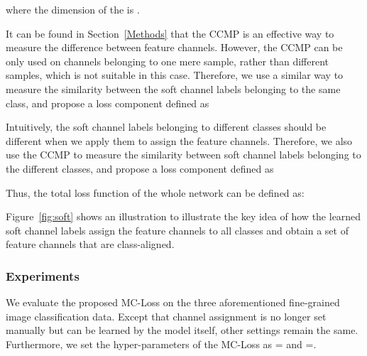 \documentclass[journal]{IEEEtran}
\begin{document}
\begin{small}

\end{small}

\noindent where the dimension of the  is .

It can be found in Section~\ref{Methods} that the CCMP is an effective way to measure the difference between feature channels. However, the CCMP can  be only  used on channels belonging to one mere sample, rather than different samples, which is not suitable in this case. Therefore, we use a similar way to measure the similarity between the soft channel labels belonging to the same class, and propose a loss component  defined as




\begin{small}

\end{small}






Intuitively, the soft channel labels belonging to different classes should be different when we apply them to assign the feature channels. Therefore, we also use the CCMP to measure the similarity between soft channel labels belonging to the different classes, and propose a loss component  defined as

\begin{small}

\end{small}

Thus, the total loss function of the whole network can be defined as:

\begin{small}

\end{small}

Figure~\ref{fig:soft} shows an illustration to illustrate the key idea of how the learned soft channel labels assign the feature channels to all classes and obtain a set of feature channels that are class-aligned.



\subsubsection{Experiments}\label{softExperiment}
We evaluate the proposed MC-Loss on the three aforementioned fine-grained  image classification data. Except that channel assignment is no longer set manually but can be learned by the model itself, other settings remain the same. Furthermore, we set the hyper-parameters of the MC-Loss as  = and =.
\end{document}
